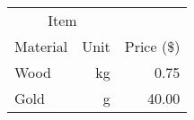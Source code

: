 \documentclass{standalone}
\begin{document}
\begin{tabular}{
		@{} %
		lrr
		@{} %
	} 
	\toprule
	\multicolumn{2}{c}{Item} \\ 
	\cmidrule(r){1-2}

	Material & Unit & Price (\$)\\ 
	\midrule

	Wood & kg & 0.75 \\
	Gold &  g & 40.00   \\

	\bottomrule
\end{tabular}
\end{document}
